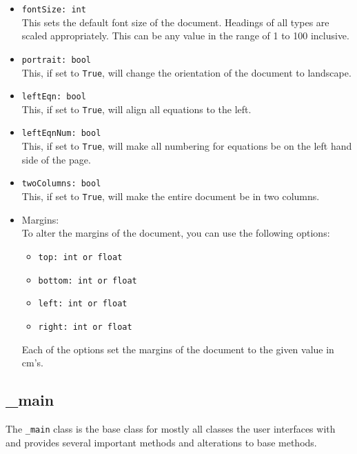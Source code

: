 \documentclass{article}
\begin{document}
\begin{itemize}
\item \verb|fontSize: int|\\
This sets the default font size of the document. Headings of all types are scaled appropriately. This can be any value in the range of 1 to 100 inclusive.
\item \verb|portrait: bool|\\
This, if set to \verb|True|, will change the orientation of the document to landscape.
\item \verb|leftEqn: bool|\\
This, if set to \verb|True|, will align all equations to the left.
\item \verb|leftEqnNum: bool|\\
This, if set to \verb|True|, will make all numbering for equations be on the left hand side of the page.
\item \verb|twoColumns: bool|\\
This, if set to \verb|True|, will make the entire document be in two columns.
\item Margins:\\
To alter the margins of the document, you can use the following options:\begin{itemize}
\item \verb|top: int or float|
\item \verb|bottom: int or float|
\item \verb|left: int or float|
\item \verb|right: int or float|
\end{itemize}
Each of the options set the margins of the document to the given value in cm's.
\end{itemize}

\subsection{\_main}\label{subsec:_main}
The \verb|_main| class is the base class for mostly all classes the user interfaces with and provides several important methods and alterations to base methods.
\end{document}
